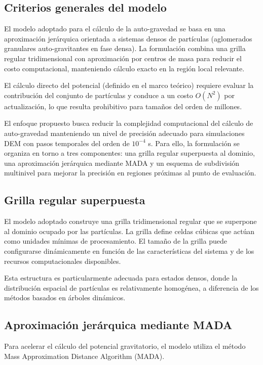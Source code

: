 \documentclass[a4paper,11pt]{book}
\begin{document}
\subsection{Criterios generales del modelo}

El modelo adoptado para el cálculo de la auto-gravedad se basa en una aproximación jerárquica orientada a sistemas densos de partículas (aglomerados granulares auto-gravitantes en fase densa). La formulación combina una grilla regular tridimensional con aproximación por centros de masa para reducir el costo computacional, manteniendo cálculo exacto en la región local relevante.

El cálculo directo del potencial (definido en el marco teórico) requiere evaluar la contribución del conjunto de partículas y conduce a un costo $O(N^2)$ por actualización, lo que resulta prohibitivo para tamaños del orden de millones.

El enfoque propuesto busca reducir la complejidad computacional del cálculo de auto-gravedad manteniendo un nivel de precisión adecuado para simulaciones DEM con pasos temporales del orden de $10^{-4}$ s. Para ello, la formulación se organiza en torno a tres componentes: una grilla regular superpuesta al dominio, una aproximación jerárquica mediante MADA y un esquema de subdivisión multinivel para mejorar la precisión en regiones próximas al punto de evaluación.

\subsection{Grilla regular superpuesta}

El modelo adoptado construye una grilla tridimensional regular que se superpone al dominio ocupado por las partículas. La grilla define celdas cúbicas que actúan como unidades mínimas de procesamiento. El tamaño de la grilla puede configurarse dinámicamente en función de las características del sistema y de los recursos computacionales disponibles.

Esta estructura es particularmente adecuada para estados densos, donde la distribución espacial de partículas es relativamente homogénea, a diferencia de los métodos basados en árboles dinámicos.

\subsection{Aproximación jerárquica mediante MADA}

Para acelerar el cálculo del potencial gravitatorio, el modelo utiliza el método Mass Approximation Distance Algorithm (MADA).
\end{document}
